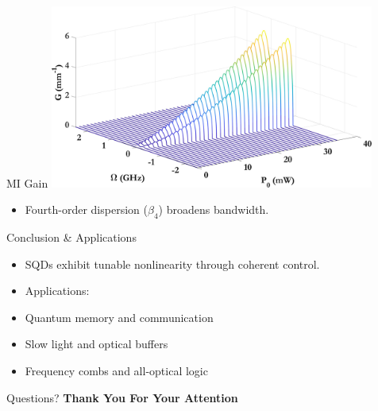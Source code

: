 \documentclass[12pt,aspectratio=1610]{beamer}
\begin{document}
\begin{frame}{MI Gain}
  \vspace{-12pt}
  \hspace*{40pt}
  \includegraphics[width=0.8\textwidth]{Assets/Beta2_Kerr.jpeg}
  \begin{itemize}
    \item Fourth-order dispersion ($\beta_4$) broadens bandwidth.
  \end{itemize}
\end{frame}

\begin{frame}{Conclusion \& Applications}
  \begin{itemize}
    \item SQDs exhibit tunable nonlinearity through coherent control.
    \item Applications:
    \item Quantum memory and communication
    \item Slow light and optical buffers
    \item Frequency combs and all-optical logic
  \end{itemize}
\end{frame}

\begin{frame}{Questions?}
  \centering
  {\Huge \bfseries Thank You For Your Attention}
\end{frame}
\end{document}
